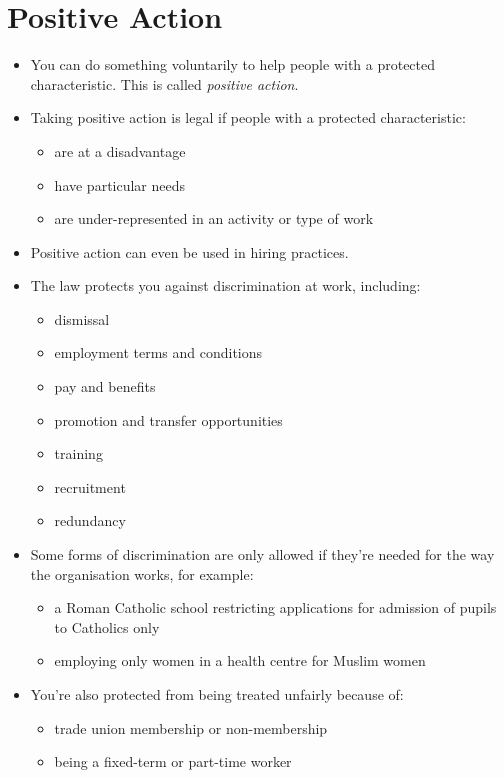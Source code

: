 \documentclass{article}
\begin{document}
\section{Positive Action}
\begin{itemize}
\item You can do something voluntarily to help people with a protected characteristic. This is called {\em positive action}.

\item Taking positive action is legal if people with a protected characteristic:

\begin{itemize}
\item     are at a disadvantage
\item     have particular needs
\item     are under-represented in an activity or type of work
\end{itemize}
\item Positive action can even be used in hiring practices.
\end{itemize}




\begin{itemize}
\item The law protects you against discrimination at work, including:

\begin{itemize}
\item dismissal
\item employment terms and conditions
\item pay and benefits
\item promotion and transfer opportunities
\item training
\item recruitment
\item redundancy
\end{itemize}

\item Some forms of discrimination are only allowed if they’re needed for the way the organisation works, for example:

\begin{itemize}
\item a Roman Catholic school restricting applications for admission of pupils to Catholics only
\item employing only women in a health centre for Muslim women
\end{itemize}

\item You're also protected from being treated unfairly because of:

\begin{itemize}
\item trade union membership or non-membership
\item being a fixed-term or part-time worker
\end{itemize}

\end{itemize}
\end{document}
